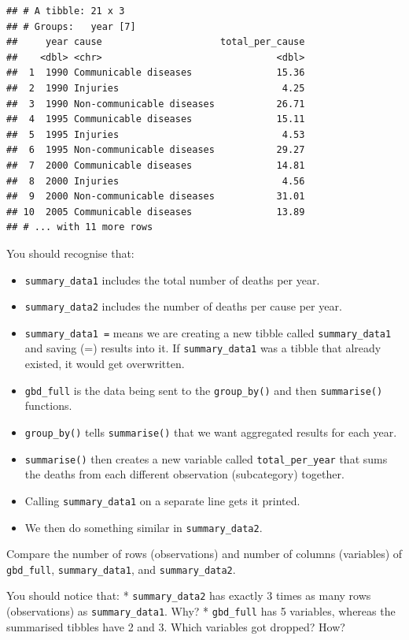 \documentclass[
  12pt,
  krantz2]{krantz}
\providecommand{\tightlist}{%
  \setlength{\itemsep}{0pt}\setlength{\parskip}{0pt}}
\begin{document}
\begin{verbatim}
## # A tibble: 21 x 3
## # Groups:   year [7]
##     year cause                     total_per_cause
##    <dbl> <chr>                               <dbl>
##  1  1990 Communicable diseases               15.36
##  2  1990 Injuries                             4.25
##  3  1990 Non-communicable diseases           26.71
##  4  1995 Communicable diseases               15.11
##  5  1995 Injuries                             4.53
##  6  1995 Non-communicable diseases           29.27
##  7  2000 Communicable diseases               14.81
##  8  2000 Injuries                             4.56
##  9  2000 Non-communicable diseases           31.01
## 10  2005 Communicable diseases               13.89
## # ... with 11 more rows
\end{verbatim}

You should recognise that:

\begin{itemize}
\tightlist
\item
  \texttt{summary\_data1} includes the total number of deaths per year.
\item
  \texttt{summary\_data2} includes the number of deaths per cause per year.
\item
  \texttt{summary\_data1\ =} means we are creating a new tibble called \texttt{summary\_data1} and saving (=) results into it. If \texttt{summary\_data1} was a tibble that already existed, it would get overwritten.
\item
  \texttt{gbd\_full} is the data being sent to the \texttt{group\_by()} and then \texttt{summarise()} functions.
\item
  \texttt{group\_by()} tells \texttt{summarise()} that we want aggregated results for each year.
\item
  \texttt{summarise()} then creates a new variable called \texttt{total\_per\_year} that sums the deaths from each different observation (subcategory) together.
\item
  Calling \texttt{summary\_data1} on a separate line gets it printed.
\item
  We then do something similar in \texttt{summary\_data2}.
\end{itemize}

Compare the number of rows (observations) and number of columns (variables) of \texttt{gbd\_full}, \texttt{summary\_data1}, and \texttt{summary\_data2}.

You should notice that:
* \texttt{summary\_data2} has exactly 3 times as many rows (observations) as \texttt{summary\_data1}. Why?
* \texttt{gbd\_full} has 5 variables, whereas the summarised tibbles have 2 and 3. Which variables got dropped? How?
\end{document}
